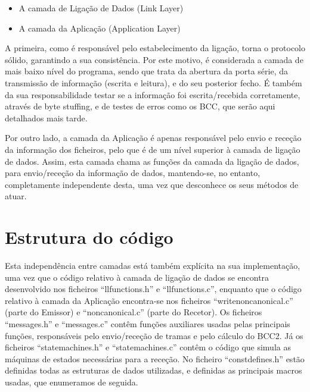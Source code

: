 \documentclass[article, a4paper, 11pt, oneside]{memoir}
\begin{document}
\begin{itemize}
	\item A camada de Ligação de Dados (Link Layer) 
	\item A camada da Aplicação (Application Layer)
\end{itemize} 

A primeira, como é responsável pelo estabelecimento da ligação, torna o protocolo sólido, garantindo a sua consistência. 
Por este motivo, é considerada a camada de mais baixo nível do programa, sendo que trata da abertura da porta série, 
da transmissão de informação (escrita e leitura), e do seu posterior fecho. 
É também da sua responsabilidade testar se a informação foi escrita/recebida corretamente, através de byte stuffing, e de testes de erros como os BCC,
que serão aqui detalhados mais tarde.

Por outro lado, a camada da Aplicação é apenas responsável pelo envio e receção da informação dos ficheiros, pelo que é de um nível superior à camada de ligação de dados.
Assim, esta camada chama as funções da camada da ligação de dados, para envio/receção da informação de dados, 
mantendo-se, no entanto, completamente independente desta, uma vez que desconhece os seus métodos de atuar.

\chapter[Estrutura do código][Estrutura do código]{Estrutura do código} \label{\thechapter}

Esta independência entre camadas está também explícita na sua implementação, uma vez que o código relativo à camada de ligação de dados se encontra desenvolvido nos ficheiros “llfunctions.h” e “llfunctions.c”, enquanto que o código relativo à camada da Aplicação encontra-se nos ficheiros “writenoncanonical.c” (parte do Emissor) e “noncanonical.c” (parte do Recetor). Os ficheiros “messages.h” e “messages.c” contêm funções auxiliares usadas pelas principais funções, responsáveis pelo envio/receção de tramas e pelo cálculo do BCC2. 
Já os ficheiros “statemachines.h” e “statemachines.c” contêm o código que simula as máquinas de estados necessárias para a receção.
No ficheiro “constdefines.h” estão definidas todas as estruturas de dados utilizadas, e definidas as principais macros usadas, que enumeramos de seguida.
\end{document}
